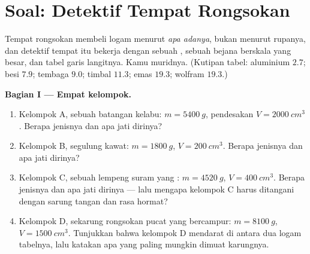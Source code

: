 \section{Soal: Detektif Tempat Rongsokan}

\begin{problem}\label{pb:g7:volume-mass-density:1}
Tempat rongsokan membeli logam menurut \emph{apa adanya}, bukan
menurut rupanya, dan detektif tempat itu bekerja dengan sebuah ,
sebuah bejana berskala yang besar, dan tabel garis langitnya. Kamu
muridnya. (Kutipan tabel: aluminium $2.7$; besi $7.9$; tembaga $9.0$;
timbal $11.3$; emas $19.3$; wolfram $19.3$.)

\medskip\noindent\textbf{Bagian I --- Empat kelompok.}
\begin{enumerate}
  \item Kelompok A, sebuah batangan kelabu: $m = \qty{5400}{g}$,
        pendesakan $V = \qty{2000}{cm^3}$. Berapa  jenisnya dan
        apa jati dirinya?
  \item Kelompok B, segulung kawat: $m = \qty{1800}{g}$,
        $V = \qty{200}{cm^3}$. Berapa  jenisnya dan apa jati
        dirinya?
  \item Kelompok C, sebuah lempeng suram yang :
        $m = \qty{4520}{g}$,
        $V = \qty{400}{cm^3}$. Berapa  jenisnya dan apa jati
        dirinya --- lalu mengapa kelompok C harus ditangani dengan
        sarung tangan dan rasa hormat?
  \item Kelompok D, sekarung rongsokan pucat yang bercampur:
        $m = \qty{8100}{g}$,
        $V = \qty{1500}{cm^3}$. Tunjukkan bahwa  kelompok D
        mendarat di antara dua logam tabelnya, lalu katakan apa yang
        paling mungkin dimuat karungnya.
\end{enumerate}


\end{problem}
